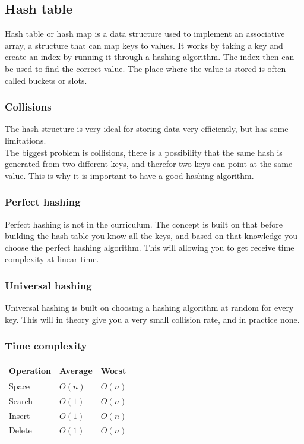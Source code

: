 \documentclass[a4paper, 10pt]{article}
\begin{document}
\subsection{Hash table}
Hash table or hash map is a data structure used to implement an associative array, a structure that can map keys to values. It works by taking a key and create an index by running it through a hashing algorithm. The index then can be used to find the correct value. The place where the value is stored is often called buckets or slots.
\subsubsection{Collisions}
The hash structure is very ideal for storing data very efficiently, but has some limitations. \\
The biggest problem is collisions, there is a possibility that the same hash is generated from two different keys, and therefor two keys can point at the same value. This is why it is important to have a good hashing algorithm.
\subsubsection{Perfect hashing}
Perfect hashing is not in the curriculum. The concept is built on that before building the hash table you know all the keys, and based on that knowledge you choose the perfect hashing algorithm. This will allowing you to get receive time complexity at linear time.
\subsubsection{Universal hashing}
Universal hashing is built on choosing a hashing algorithm at random for every key. This will in theory give you a very small collision rate, and in practice none.

\subsubsection{Time complexity}
\begin{tabular}{|l|l|l|}
    \hline
    Operation & Average & Worst \\ \hline
    Space     & $O(n)$       & $O(n)$     \\ \hline
    Search    & $O(1)$       & $O(n)$     \\ \hline
    Insert    & $O(1)$       & $O(n)$     \\ \hline
    Delete    & $O(1)$       & $O(n)$     \\ \hline
\end{tabular}
\end{document}
